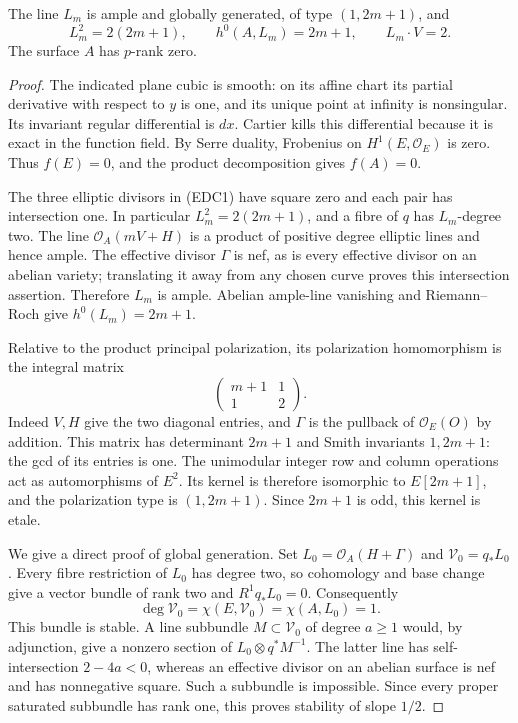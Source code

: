 \begin{lemma}
\label{lem:root-elliptic-double-cover-lines}
The line \(L_m\) is ample and globally generated, of type
\((1,2m+1)\), and
\[
 L_m^2=2(2m+1),\qquad h^0(A,L_m)=2m+1,
                  \qquad L_m\cdot V=2.              \tag{EDC2}
\]
The surface \(A\) has \(p\)-rank zero.
\end{lemma}
\begin{proof}
The indicated plane cubic is smooth: on its affine chart its
partial derivative with respect to \(y\) is one, and its unique
point at infinity is nonsingular. Its invariant regular
differential is \(dx\). Cartier kills this differential because
it is exact in the function field. By Serre duality, Frobenius
on \(H^1(E,\mathcal O_E)\) is zero. Thus \(f(E)=0\), and
the product decomposition gives \(f(A)=0\).

The three elliptic divisors in (EDC1) have square zero and each
pair has intersection one. In particular
\(L_m^2=2(2m+1)\), and a fibre of \(q\) has \(L_m\)-degree
two. The line \(\mathcal O_A(mV+H)\) is a product of positive
degree elliptic lines and hence ample. The effective divisor
\(\Gamma\) is nef, as is every effective divisor on an abelian
variety; translating it away from any chosen curve proves this
intersection assertion. Therefore \(L_m\) is ample. Abelian
ample-line vanishing and Riemann--Roch give \(h^0(L_m)=2m+1\).

Relative to the product principal polarization, its polarization
homomorphism is the integral matrix
\[
                    \begin{pmatrix}m+1&1\\1&2\end{pmatrix}.
                                                        \tag{EDC3}
\]
Indeed \(V,H\) give the two diagonal entries, and \(\Gamma\)
is the pullback of \(\mathcal O_E(O)\) by addition. This
matrix has determinant \(2m+1\) and Smith invariants
\(1,2m+1\): the gcd of its entries is one. The unimodular
integer row and column operations act as automorphisms of
\(E^2\). Its kernel is therefore isomorphic to \(E[2m+1]\),
and the polarization type is \((1,2m+1)\). Since \(2m+1\)
is odd, this kernel is etale.

We give a direct proof of global generation. Set
\(L_0=\mathcal O_A(H+\Gamma)\) and
\(\mathcal V_0=q_*L_0\). Every fibre restriction of \(L_0\)
has degree two, so cohomology and base change give a vector
bundle of rank two and \(R^1q_*L_0=0\). Consequently
\[
             \deg\mathcal V_0=\chi(E,\mathcal V_0)
                 =\chi(A,L_0)=1.                    \tag{EDC4}
\]
This bundle is stable. A line subbundle \(M\subset\mathcal V_0\)
of degree \(a\ge1\) would, by adjunction, give a nonzero
section of \(L_0\otimes q^*M^{-1}\). The latter line has
self-intersection \(2-4a<0\), whereas an effective divisor
on an abelian surface is nef and has nonnegative square.
Such a subbundle is impossible. Since every proper saturated
subbundle has rank one, this proves stability of slope \(1/2\).


\end{proof}
